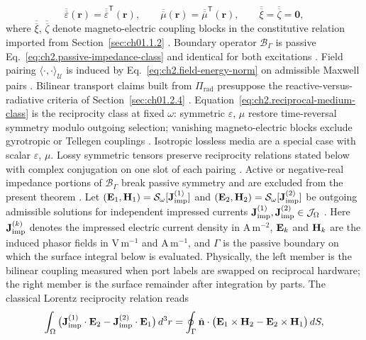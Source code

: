 \begin{equation}
\label{eq:ch2.reciprocal-medium-class}
\overline{\overline{\varepsilon}}(\mathbf{r})=\overline{\overline{\varepsilon}}^{\mathsf{T}}(\mathbf{r}),
\qquad
\overline{\overline{\mu}}(\mathbf{r})=\overline{\overline{\mu}}^{\mathsf{T}}(\mathbf{r}),
\qquad
\overline{\overline{\xi}}=\overline{\overline{\zeta}}=\mathbf{0},
\end{equation}
where \(\overline{\overline{\xi}}\), \(\overline{\overline{\zeta}}\) denote magneto-electric
coupling blocks in the constitutive relation imported from Section~\ref{sec:ch01.1.2}
\cite{stratton1941}. Boundary operator \(\mathcal{B}_\Gamma\) is passive
Eq.~\eqref{eq:ch2.passive-impedance-class} and identical for both excitations
\cite{stratton1941}. Field pairing \(\langle\cdot,\cdot\rangle_{\mathcal{U}}\)
is induced by Eq.~\eqref{eq:ch2.field-energy-norm} on admissible Maxwell pairs
\cite{stratton1941}. Bilinear transport claims built from $\Pi_{\mathrm{rad}}$ presuppose the
reactive-versus-radiative criteria of Section~\ref{sec:ch01.2.4} \cite{harrington2001}.
Equation~\eqref{eq:ch2.reciprocal-medium-class} is the reciprocity class at fixed $\omega$:
symmetric $\varepsilon$, $\mu$ restore time-reversal symmetry modulo outgoing selection;
vanishing magneto-electric blocks exclude gyrotropic or Tellegen couplings
\cite{stratton1941}. Isotropic lossless media are a special
case with scalar \(\varepsilon\), \(\mu\). Lossy symmetric tensors preserve reciprocity
relations stated below with complex conjugation on one slot of each pairing
\cite{stratton1941}. Active or negative-real impedance portions of
\(\mathcal{B}_\Gamma\) break passive symmetry and are excluded from the present theorem
\cite{stratton1941}.
Let \((\mathbf{E}_1,\mathbf{H}_1)=\mathcal{S}_\omega[\mathbf{J}_{\mathrm{imp}}^{(1)}]\) and
\((\mathbf{E}_2,\mathbf{H}_2)=\mathcal{S}_\omega[\mathbf{J}_{\mathrm{imp}}^{(2)}]\) be outgoing admissible solutions for
independent impressed currents \(\mathbf{J}_{\mathrm{imp}}^{(1)},\mathbf{J}_{\mathrm{imp}}^{(2)}\in\mathcal{J}_\Omega\)
\cite{stratton1941}. Here \(\mathbf{J}_{\mathrm{imp}}^{(k)}\) denotes the impressed electric current density in
\(\mathrm{A\,m^{-2}}\), \(\mathbf{E}_k\) and \(\mathbf{H}_k\) are the induced phasor fields in \(\mathrm{V\,m^{-1}}\)
and \(\mathrm{A\,m^{-1}}\), and \(\Gamma\) is the passive boundary on which the surface integral
below is evaluated. Physically, the left member is the bilinear coupling measured when port labels
are swapped on reciprocal hardware; the right member is the surface remainder after integration by
parts. The classical Lorentz reciprocity relation reads
\begin{equation}
\label{eq:ch2.lorentz-volume-reciprocity}
\int_\Omega
\big(\mathbf{J}_{\mathrm{imp}}^{(1)}\cdot\mathbf{E}_2-\mathbf{J}_{\mathrm{imp}}^{(2)}\cdot\mathbf{E}_1\big)\,d^{3}r
=
\oint_\Gamma
\hat{\mathbf{n}}\cdot\big(\mathbf{E}_1\times\mathbf{H}_2-\mathbf{E}_2\times\mathbf{H}_1\big)\,dS,
\end{equation}
